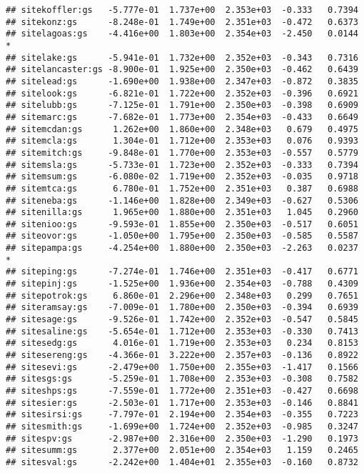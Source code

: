 \documentclass[
]{article}
\begin{document}
\begin{verbatim}
## sitekoffler:gs   -5.777e-01  1.737e+00  2.353e+03  -0.333   0.7394  
## sitekonz:gs      -8.248e-01  1.749e+00  2.351e+03  -0.472   0.6373  
## sitelagoas:gs    -4.416e+00  1.803e+00  2.354e+03  -2.450   0.0144 *
## sitelake:gs      -5.941e-01  1.732e+00  2.352e+03  -0.343   0.7316  
## sitelancaster:gs -8.900e-01  1.925e+00  2.350e+03  -0.462   0.6439  
## sitelead:gs      -1.690e+00  1.938e+00  2.347e+03  -0.872   0.3835  
## sitelook:gs      -6.821e-01  1.722e+00  2.352e+03  -0.396   0.6921  
## sitelubb:gs      -7.125e-01  1.791e+00  2.350e+03  -0.398   0.6909  
## sitemarc:gs      -7.682e-01  1.773e+00  2.354e+03  -0.433   0.6649  
## sitemcdan:gs      1.262e+00  1.860e+00  2.348e+03   0.679   0.4975  
## sitemcla:gs       1.304e-01  1.712e+00  2.353e+03   0.076   0.9393  
## sitemitch:gs     -9.848e-01  1.770e+00  2.353e+03  -0.557   0.5779  
## sitemsla:gs      -5.733e-01  1.723e+00  2.352e+03  -0.333   0.7394  
## sitemsum:gs      -6.080e-02  1.719e+00  2.352e+03  -0.035   0.9718  
## sitemtca:gs       6.780e-01  1.752e+00  2.351e+03   0.387   0.6988  
## siteneba:gs      -1.146e+00  1.828e+00  2.349e+03  -0.627   0.5306  
## sitenilla:gs      1.965e+00  1.880e+00  2.351e+03   1.045   0.2960  
## sitenioo:gs      -9.593e-01  1.855e+00  2.350e+03  -0.517   0.6051  
## siteovor:gs      -1.050e+00  1.795e+00  2.350e+03  -0.585   0.5587  
## sitepampa:gs     -4.254e+00  1.880e+00  2.350e+03  -2.263   0.0237 *
## siteping:gs      -7.274e-01  1.746e+00  2.351e+03  -0.417   0.6771  
## sitepinj:gs      -1.525e+00  1.936e+00  2.354e+03  -0.788   0.4309  
## sitepotrok:gs     6.860e-01  2.296e+00  2.348e+03   0.299   0.7651  
## siteramsay:gs    -7.009e-01  1.780e+00  2.350e+03  -0.394   0.6939  
## sitesage:gs      -9.526e-01  1.742e+00  2.352e+03  -0.547   0.5845  
## sitesaline:gs    -5.654e-01  1.712e+00  2.353e+03  -0.330   0.7413  
## sitesedg:gs       4.016e-01  1.719e+00  2.353e+03   0.234   0.8153  
## sitesereng:gs    -4.366e-01  3.222e+00  2.357e+03  -0.136   0.8922  
## sitesevi:gs      -2.479e+00  1.750e+00  2.355e+03  -1.417   0.1566  
## sitesgs:gs       -5.259e-01  1.708e+00  2.353e+03  -0.308   0.7582  
## siteshps:gs      -7.559e-01  1.772e+00  2.351e+03  -0.427   0.6698  
## sitesier:gs      -2.503e-01  1.717e+00  2.353e+03  -0.146   0.8841  
## sitesirsi:gs     -7.797e-01  2.194e+00  2.354e+03  -0.355   0.7223  
## sitesmith:gs     -1.699e+00  1.724e+00  2.352e+03  -0.985   0.3247  
## sitespv:gs       -2.987e+00  2.316e+00  2.350e+03  -1.290   0.1973  
## sitesumm:gs       2.377e+00  2.051e+00  2.354e+03   1.159   0.2465  
## sitesval:gs      -2.242e+00  1.404e+01  2.355e+03  -0.160   0.8732  

\end{verbatim}
\end{document}
